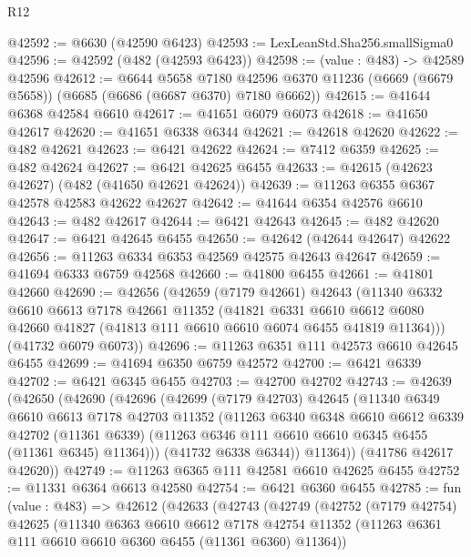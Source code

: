 \begin{lexlean}{R12}
\begin{coremodule}
@42592 := @6630 (@42590 @6423)
@42593 := LexLeanStd.Sha256.smallSigma0
@42596 := @42592 (@482 (@42593 @6423))
@42598 := (value : @483) -> @42589 @42596
@42612 := @6644
    @5658
    @7180
    @42596
    @6370
    @11236
    (@6669 (@6679 @5658))
    (@6685 (@6686 (@6687 @6370) @7180 @6662))
@42615 := @41644 @6368 @42584 @6610
@42617 := @41651 @6079 @6073
@42618 := @41650 @42617
@42620 := @41651 @6338 @6344
@42621 := @42618 @42620
@42622 := @482 @42621
@42623 := @6421 @42622
@42624 := @7412 @6359
@42625 := @482 @42624
@42627 := @6421 @42625 @6455
@42633 := @42615 (@42623 @42627) (@482 (@41650 @42621 @42624))
@42639 := @11263 @6355 @6367 @42578 @42583 @42622 @42627
@42642 := @41644 @6354 @42576 @6610
@42643 := @482 @42617
@42644 := @6421 @42643
@42645 := @482 @42620
@42647 := @6421 @42645 @6455
@42650 := @42642 (@42644 @42647) @42622
@42656 := @11263 @6334 @6353 @42569 @42575 @42643 @42647
@42659 := @41694 @6333 @6759 @42568
@42660 := @41800 @6455
@42661 := @41801 @42660
@42690 := @42656
    (@42659
      (@7179 @42661)
      @42643
      (@11340
        @6332
        @6610
        @6613
        @7178
        @42661
        @11352
        (@41821
          @6331
          @6610
          @6612
          @6080
          @42660
          @41827
          (@41813 @111 @6610 @6610 @6074 @6455 @41819 @11364)))
      (@41732 @6079 @6073))
@42696 := @11263 @6351 @111 @42573 @6610 @42645 @6455
@42699 := @41694 @6350 @6759 @42572
@42700 := @6421 @6339
@42702 := @6421 @6345 @6455
@42703 := @42700 @42702
@42743 := @42639
    (@42650
      (@42690
        (@42696
          (@42699
            (@7179 @42703)
            @42645
            (@11340
              @6349
              @6610
              @6613
              @7178
              @42703
              @11352
              (@11263
                @6340
                @6348
                @6610
                @6612
                @6339
                @42702
                (@11361 @6339)
                (@11263 @6346 @111 @6610 @6610 @6345 @6455 (@11361 @6345) @11364)))
            (@41732 @6338 @6344))
          @11364))
      (@41786 @42617 @42620))
@42749 := @11263 @6365 @111 @42581 @6610 @42625 @6455
@42752 := @11331 @6364 @6613 @42580
@42754 := @6421 @6360 @6455
@42785 := fun (value : @483) =>
  @42612
    (@42633
      (@42743
        (@42749
          (@42752
            (@7179 @42754)
            @42625
            (@11340
              @6363
              @6610
              @6612
              @7178
              @42754
              @11352
              (@11263 @6361 @111 @6610 @6610 @6360 @6455 (@11361 @6360) @11364))

\end{coremodule}
\end{lexlean}
